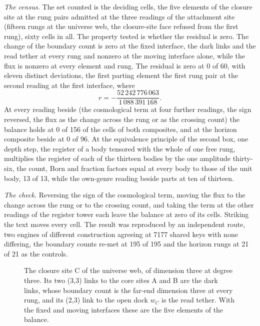 \begin{chproof}
\textit{The census.} The set counted is the deciding cells, the five elements of the closure site at the rung pairs admitted at the three readings of the attachment site (fifteen rungs at the universe web, the closure-site face refused from the first rung), sixty cells in all. The property tested is whether the residual is zero. The change of the boundary count is zero at the fixed interface, the dark links and the read tether at every rung and nonzero at the moving interface alone, while the flux is nonzero at every element and rung. The residual is zero at 0 of 60, with eleven distinct deviations, the first parting element the first rung pair at the second reading at the first interface, where
\begin{equation}
r=-\frac{52\,242\,776\,063}{1\,088\,391\,168} .
\end{equation}
At every reading beside (the cosmological term at four further readings, the sign reversed, the flux as the change across the rung or as the crossing count) the balance holds at 0 of 156 of the cells of both composites, and at the horizon composite beside at 0 of 96. At the equivalence principle of the second box, one depth step, the register of a body tensored with the whole of one free rung, multiplies the register of each of the thirteen bodies by the one amplitude thirty-six, the count, Born and fraction factors equal at every body to those of the unit body, 13 of 13, while the own-genre reading beside parts at ten of thirteen.

\textit{The check.} Reversing the sign of the cosmological term, moving the flux to the change across the rung or to the crossing count, and taking the term at the other readings of the register tower each leave the balance at zero of its cells. Striking the text moves every cell. The result was reproduced by an independent route, two engines of different construction agreeing at 7177 shared keys with none differing, the boundary counts re-met at 195 of 195 and the horizon rungs at 21 of 21 as the controls.
\end{chproof}
\begin{figure}[h]
\centering
{}
\caption{The closure site C of the universe web, of dimension three at degree three. Its two (3,3) links to the core sites A and B are the dark links, whose boundary count is the far-end dimension three at every rung, and its (2,3) link to the open dock $w_C$ is the read tether. With the fixed and moving interfaces these are the five elements of the balance.}
\end{figure}
